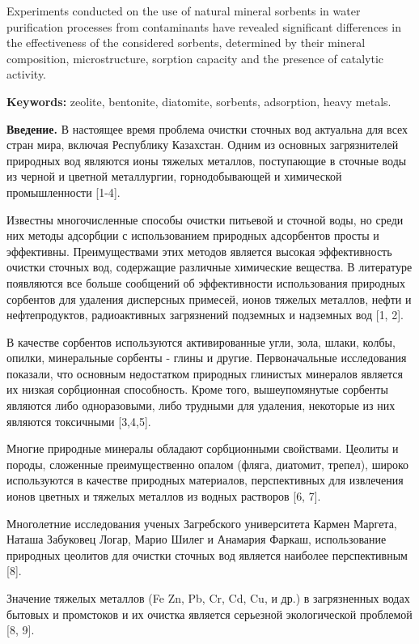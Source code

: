 Experiments conducted on the use of natural mineral sorbents in water
purification processes from contaminants have revealed significant
differences in the effectiveness of the considered sorbents, determined
by their mineral composition, microstructure, sorption capacity and the
presence of catalytic activity.

{\bfseries Keywords:} zeolite, bentonite, diatomite, sorbents, adsorption,
heavy metals.

{\bfseries Введение.} В настоящее время проблема очистки сточных вод
актуальна для всех стран мира, включая Республику Казахстан. Одним из
основных загрязнителей природных вод являются ионы тяжелых металлов,
поступающие в сточные воды из черной и цветной металлургии,
горнодобывающей и химической промышленности {[}1-4{]}.

Известны многочисленные способы очистки питьевой и сточной воды, но
среди них методы адсорбции с использованием природных адсорбентов просты
и эффективны. Преимуществами этих методов является высокая эффективность
очистки сточных вод, содержащие различные химические вещества. В
литературе появляются все больше сообщений об эффективности
использования природных сорбентов для удаления дисперсных примесей,
ионов тяжелых металлов, нефти и нефтепродуктов, радиоактивных
загрязнений подземных и надземных вод {[}1, 2{]}.

В качестве сорбентов используются активированные угли, зола, шлаки,
колбы, опилки, минеральные сорбенты - глины и другие. Первоначальные
исследования показали, что основным недостатком природных глинистых
минералов является их низкая сорбционная способность. Кроме того,
вышеупомянутые сорбенты являются либо одноразовыми, либо трудными для
удаления, некоторые из них являются токсичными {[}3,4,5{]}.

Многие природные минералы обладают сорбционными свойствами. Цеолиты и
породы, сложенные преимущественно опалом (фляга, диатомит, трепел),
широко используются в качестве природных материалов, перспективных для
извлечения ионов цветных и тяжелых металлов из водных растворов {[}6,
7{]}.

Многолетние исследования ученых Загребского университета Кармен Маргета,
Наташа Забуковец Логар, Марио Шилег и Анамария Фаркаш, использование
природных цеолитов для очистки сточных вод является наиболее
перспективным {[}8{]}.

Значение тяжелых металлов (Fe Zn, Pb, Cr, Cd, Cu, и др.) в загрязненных
водах бытовых и промстоков и их очистка является серьезной экологической
проблемой {[}8, 9{]}.

